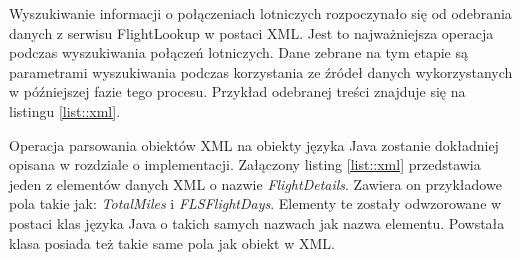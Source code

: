 \documentclass[12pt, twoside]{report}
\begin{document}
Wyszukiwanie informacji o połączeniach lotniczych rozpoczynało się od odebrania danych z serwisu FlightLookup w postaci XML. Jest to najważniejsza operacja podczas wyszukiwania połączeń lotniczych. Dane zebrane na tym etapie są parametrami wyszukiwania podczas korzystania ze źródeł danych wykorzystanych w późniejszej fazie tego procesu. Przykład odebranej treści znajduje się na listingu \ref{list::xml}.

Operacja parsowania obiektów XML na obiekty języka Java zostanie dokładniej opisana w rozdziale o implementacji. Załączony listing \ref{list::xml} przedstawia jeden z elementów danych XML o nazwie \textit{FlightDetails}. Zawiera on przykładowe pola takie jak: \textit{TotalMiles} i \textit{FLSFlightDays}. Elementy te zostały odwzorowane w postaci klas języka Java o takich samych nazwach jak nazwa elementu. Powstała klasa posiada też takie same pola jak obiekt w XML.
\end{document}
